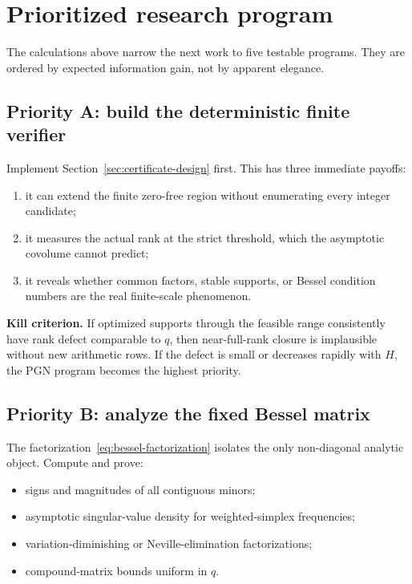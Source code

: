 \documentclass[11pt,oneside]{article}
\theoremstyle{definition}
\theoremstyle{remark}
\begin{document}
\section{Prioritized research program}
\label{sec:research-program}

The calculations above narrow the next work to five testable programs.  They are ordered by
expected information gain, not by apparent elegance.

\subsection{Priority A: build the deterministic finite verifier}

Implement Section~\ref{sec:certificate-design} first.  This has three immediate payoffs:

\begin{enumerate}
\item it can extend the finite zero-free region without enumerating every integer candidate;
\item it measures the actual rank at the strict threshold, which the asymptotic covolume cannot
predict;
\item it reveals whether common factors, stable supports, or Bessel condition numbers are the
real finite-scale phenomenon.
\end{enumerate}

\textbf{Kill criterion.}  If optimized supports through the feasible range consistently have
rank defect comparable to $q$, then near-full-rank closure is implausible without new
arithmetic rows.  If the defect is small or decreases rapidly with $H$, the PGN program becomes
the highest priority.

\subsection{Priority B: analyze the fixed Bessel matrix}

The factorization~\eqref{eq:bessel-factorization} isolates the only non-diagonal analytic
object.  Compute and prove:

\begin{itemize}
\item signs and magnitudes of all contiguous minors;
\item asymptotic singular-value density for weighted-simplex frequencies;
\item variation-diminishing or Neville-elimination factorizations;
\item compound-matrix bounds uniform in $q$.
\end{itemize}
\end{document}
